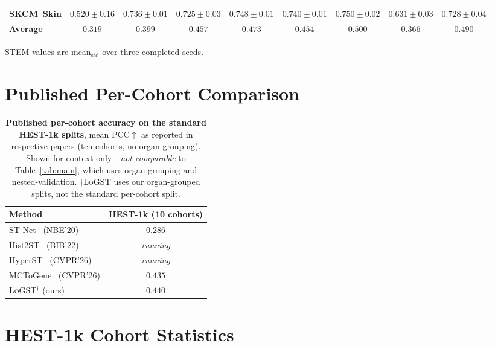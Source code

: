 \documentclass[10pt,twocolumn,letterpaper]{article}
\newcommand{\morph}{\textsc{LoGST}}
\newcommand{\best}[1]{{\bfseries\boldmath #1}}
\newcommand{\running}{\multicolumn{1}{c}{\textit{running}}}
\begin{document}
\begin{table}[h]
{\begin{tabular}{l cccc cccc}
SKCM~\tiny{Skin}       & $0.520{\pm}0.16$ & $0.736{\pm}0.01$ & $0.725{\pm}0.03$ & $0.748{\pm}0.01$ & $0.740{\pm}0.01$ & \best{$0.750{\pm}0.02$} & $0.631{\pm}0.03$ & $0.728{\pm}0.04$ \\
\midrule
\textbf{Average}       & $0.319$ & $0.399$ & $0.457$ & $0.473$ & $0.454$ & \best{$0.500$} & $0.366$ & $0.490$ \\
\bottomrule
\end{tabular}%
}
\begin{minipage}{\linewidth}
\vspace{2pt}\footnotesize
STEM values are mean$_{\mathrm{std}}$ over three completed seeds.
\end{minipage}
\end{table}

\section{Published Per-Cohort Comparison}
\label{app:published}

\begin{table}[h]
\centering
\caption{\textbf{Published per-cohort accuracy on the standard HEST-1k splits}, mean PCC$\uparrow$
as reported in respective papers (ten cohorts, no organ grouping). Shown for context
only---\emph{not comparable} to Table~\ref{tab:main}, which uses organ grouping and
nested-validation. $\dagger$\morph{} uses our organ-grouped splits, not the standard per-cohort split.}
\label{tab:published}
\small
\begin{tabular}{lc}
\toprule
Method & HEST-1k (10 cohorts) \\
\midrule
ST-Net~\cite{he2020stnet} (NBE'20)            & $0.286$ \\
Hist2ST~\cite{zeng2022hist2st} (BIB'22)       & \running \\
HyperST~\cite{zhang2026hyperst} (CVPR'26)      & \running \\
MCToGene~\cite{sun2026mctogene} (CVPR'26)      & \best{$0.435$} \\
\midrule
\morph{}$^\dagger$ (ours)                   & $0.440$ \\
\bottomrule
\end{tabular}
\end{table}

\section{HEST-1k Cohort Statistics}
\label{app:cohort_stats}
\end{document}
